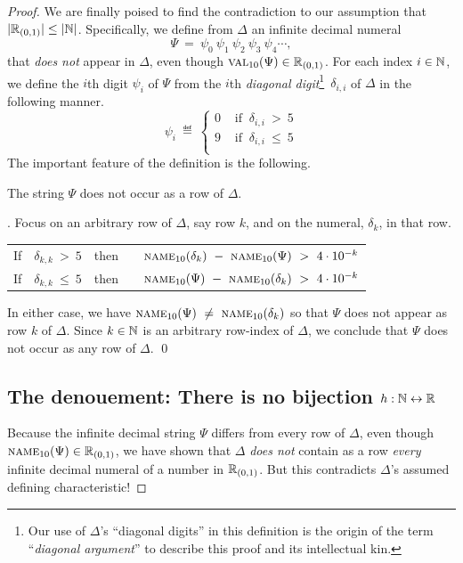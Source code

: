 \begin{proof}
We are finally poised to find the contradiction to our assumption that
$|\mathbb{R}_{(0,1)}| \leq |\mathbb{N}|$.  Specifically, we define from $\Delta$ an
infinite decimal numeral
\[ \Psi \ = \ \psi_0 \ \psi_1 \ \psi_2 \ \psi_3 \ \psi_4 \cdots, \]
that {\em does not} appear in $\Delta$, even though $\mbox{\sc
  val}_{10}(\Psi) \in \mathbb{R}_{(0,1)}$.  For each index $i \in \mathbb{N}$, we
define the $i$th digit $\psi_i$ of $\Psi$ from the $i$th {\em diagonal
  digit}\footnote{Our use of $\Delta$'s ``diagonal digits'' in this
  definition is the origin of the term ``{\em diagonal argument}'' to
  describe this proof and its intellectual kin.}~$\delta_{i,i}$ of
$\Delta$ in the following manner.
\[ \psi_i \ \eqdef \
\left\{
\begin{array}{cc}
0 & \mbox{ if } \ \delta_{i,i} \ > \ 5 \\
9 & \mbox{ if } \ \delta_{i,i} \ \leq \ 5 \\
\end{array}
\right.
\]
The important feature of the definition is the following.

\begin{lemma}
\label{lem:PSI-notin-DELTA}
The string $\Psi$ does not occur as a row of $\Delta$.
\end{lemma}

.
Focus on an arbitrary row of $\Delta$, say row $k$, and on the numeral,
$\delta_k$, in that row.

\begin{tabular}{lclc}
If & $\delta_{k,k} \ > \ 5$ & then & \ \
$\mbox{\sc name}_{10}(\delta_k) \ - \ \mbox{\sc name}_{10}(\Psi) \ > \ 4
\cdot 10^{-k}$ \\
If & $\delta_{k,k} \ \leq \ 5$ & then & \ \
$\mbox{\sc name}_{10}(\Psi) \ - \ \mbox{\sc name}_{10}(\delta_k) \ > \ 4
\cdot 10^{-k}$
\end{tabular}

\noindent
In either case, we have $\mbox{\sc name}_{10}(\Psi) \ \neq \ \mbox{\sc
  name}_{10}(\delta_k)$ so that $\Psi$ does not appear as row $k$ of
$\Delta$.  Since $k \in \mathbb{N}$ is an arbitrary row-index of $\Delta$, we
conclude that $\Psi$ does not occur as any row of $\Delta$.  \qed

\subsection{The denouement: There is no bijection  $h: \mathbb{N} \leftrightarrow \mathbb{R}$}

Because the infinite decimal string $\Psi$ differs from every row of
$\Delta$, even though $\mbox{\sc name}_{10}(\Psi) \in \mathbb{R}_{(0,1)}$, we
have shown that $\Delta$ {\em does not} contain as a row {\em every}
infinite decimal numeral of a number in $\mathbb{R}_{(0,1)}$.  But this
contradicts $\Delta$'s assumed defining characteristic!


\end{proof}
